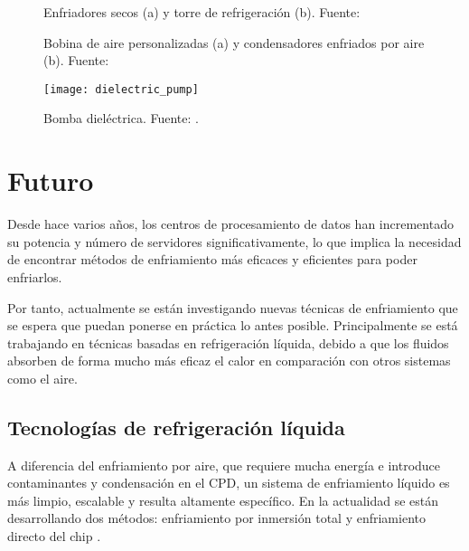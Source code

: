\begin{figure}%
    \centering
    \qquad
    \caption{Enfriadores secos (a) y torre de refrigeración (b). Fuente: \cite{Kelvion}}%
    \label{fig:dry_cooler_cooling_tower}%
\end{figure}

\begin{figure}%
    \centering
    \qquad
    \caption{Bobina de aire personalizadas (a) y condensadores enfriados por aire (b). Fuente: \cite{Kelvion}}%
    \label{fig:custom_air_coils_air_cooled_condensers}%
\end{figure}

\begin{figure}[H]
    \begin{center}
        \texttt{[image: dielectric\_pump]}
        \caption{Bomba dieléctrica. Fuente: \cite{Kelvion}.}
        \label{dielectric_pump}
    \end{center}
\end{figure}




\section{Futuro} \label{futuro}

Desde hace varios años, los centros de procesamiento de datos han incrementado su potencia y número de servidores significativamente, lo que implica la necesidad de encontrar métodos de enfriamiento más eficaces y eficientes para poder enfriarlos.

Por tanto, actualmente se están investigando nuevas técnicas de enfriamiento que se espera que puedan ponerse en práctica lo antes posible. Principalmente se está trabajando en técnicas basadas en refrigeración líquida, debido a que los fluidos absorben de forma mucho más eficaz el calor en comparación con otros sistemas como el aire.


\subsection{Tecnologías de refrigeración líquida}

A diferencia del enfriamiento por aire, que requiere mucha energía e introduce contaminantes y condensación en el CPD, un sistema de enfriamiento líquido es más limpio, escalable y resulta altamente específico. En la actualidad se están desarrollando dos métodos: enfriamiento por inmersión total y enfriamiento directo del chip \cite{datacenters-future}.


